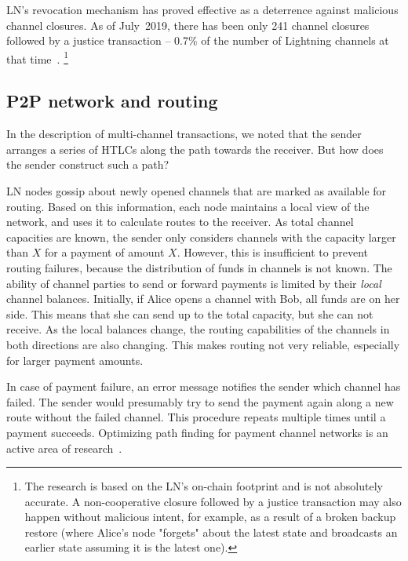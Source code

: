 LN's revocation mechanism has proved effective as a deterrence against malicious channel closures.
As of July~2019, there has been only 241 channel closures followed by a justice transaction -- 0.7\% of the number of Lightning channels at that time~\cite{BitMEXLN3}.
\footnote{The research is based on the LN's on-chain footprint and is not absolutely accurate. A non-cooperative closure followed by a justice transaction may also happen without malicious intent, for example, as a result of a broken backup restore (where Alice's node "forgets" about the latest state and broadcasts an earlier state assuming it is the latest one).}


\subsection{P2P network and routing}

In the description of multi-channel transactions, we noted that the sender arranges a series of HTLCs along the path towards the receiver.
But how does the sender construct such a path?

LN nodes gossip about newly opened channels that are marked as available for routing.
Based on this information, each node maintains a local view of the network, and uses it to calculate routes to the receiver.
As total channel capacities are known, the sender only considers channels with the capacity larger than $X$ for a payment of amount $X$.
However, this is insufficient to prevent routing failures, because the distribution of funds in channels is not known.
The ability of channel parties to send or forward payments is limited by their \textit{local} channel balances.
Initially, if Alice opens a channel with Bob, all funds are on her side.
This means that she can send up to the total capacity, but she can not receive.
As the local balances change, the routing capabilities of the channels in both directions are also changing.
This makes routing not very reliable, especially for larger payment amounts.

In case of payment failure, an error message notifies the sender which channel has failed.
The sender would presumably try to send the payment again along a new route without the failed channel.
This procedure repeats multiple times until a payment succeeds.
Optimizing path finding for payment channel networks is an active area of research~\cite{Pickhardt2019a, Prihodko2016, Grunspan2018, Pickhardt2019, Piatkivskyi2018, Sivaraman2018, Bagaria2019, Roos2018}.



